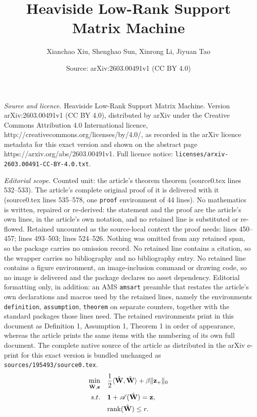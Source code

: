 \documentclass[10pt,a4paper]{amsart}
\title{Heaviside Low-Rank Support Matrix Machine}
\author{Xianchao Xiu, Shenghao Sun, Xinrong Li, Jiyuan Tao}
\date{Source: arXiv:2603.00491v1 (CC BY 4.0)}
\begin{document}
\maketitle

\noindent\emph{Source and licence.} Heaviside Low-Rank Support Matrix Machine. Version arXiv:2603.00491v1 (CC BY 4.0), distributed by arXiv under the Creative Commons Attribution 4.0 International licence, http://creativecommons.org/licenses/by/4.0/, as recorded in the arXiv licence metadata for this exact version and shown on the abstract page https://arxiv.org/abs/2603.00491v1. Full licence notice: \texttt{licenses/arxiv-2603.00491-CC-BY-4.0.txt}.\par\smallskip

\noindent\textit{Editorial scope.} Counted unit: the article's theorem theorem (source0.tex lines 532--533). The article's complete original proof of it is delivered with it (source0.tex lines 535--578, one \texttt{proof} environment of 44 lines). No mathematics is written, repaired or re-derived: the statement and the proof are the article's own lines, in the article's own notation, and no retained line is substituted or re-flowed.  Retained uncounted as the source-local context the proof needs: lines 450--457; lines 493--503; lines 524--526.  Nothing was omitted from any retained span, so the package carries no omission record.  No retained line contains a citation, so the wrapper carries no bibliography and no bibliography entry.  No retained line contains a figure environment, an image-inclusion command or drawing code, so no image is delivered and the package declares no asset dependency.  Editorial formatting only, in addition: an AMS \texttt{amsart} preamble that restates the article's own declarations and macros used by the retained lines, namely the environments \texttt{definition}, \texttt{assumption}, \texttt{theorem} on separate counters, together with the standard packages those lines need.  The retained environments print in this document as Definition 1, Assumption 1, Theorem 1 in order of appearance, whereas the article prints the same items with the numbering of its own full document.  The complete native source of the article as distributed in the arXiv e-print for this exact version is bundled unchanged as \texttt{sources/195493/source0.tex}.
\begin{equation}\label{RSMM3} 
	\begin{aligned}
        \min\limits_{\hat{\mathbf{W}},\mathbf{z}}\quad
		&\frac{1}{2}\langle\hat{\mathbf{W}},\hat{\mathbf{W}}\rangle+\beta\|{\mathbf{z}}_+\|_0\\
		{\rm s.t.}\quad &\mathbf{1}+\mathscr{A}(\hat{\mathbf{W}})=\mathbf{z},\\
		\quad & \text{rank}(\hat{\mathbf{W}}) \leq r.\\
	\end{aligned}
\end{equation}
\end{document}
